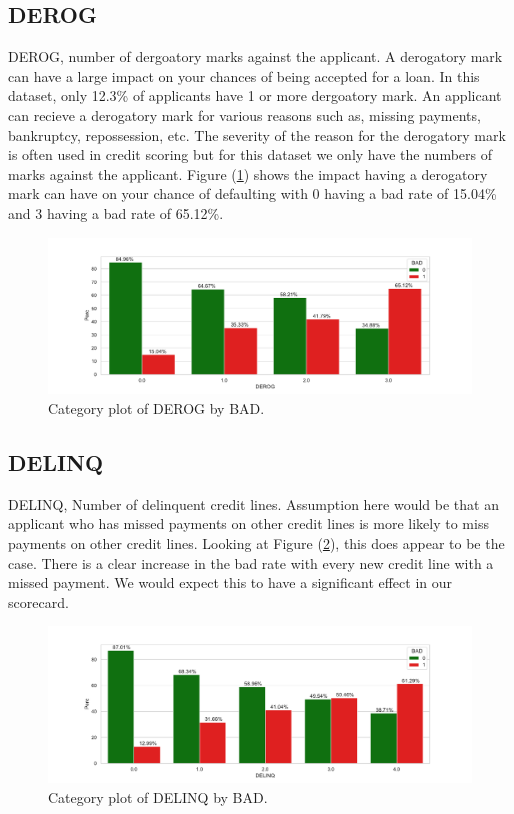 \subsection*{DEROG}

DEROG,  number of dergoatory marks against the applicant. A derogatory mark can have a large impact on your chances of being accepted for a loan. In this dataset,  only 12.3\% of applicants have 1 or more dergoatory mark. An applicant can recieve a derogatory mark for various reasons such as,  missing payments, bankruptcy, repossession, etc. The severity of the reason for the derogatory mark is often used in credit scoring but for this dataset we only have the numbers of marks against the applicant. Figure (\ref{derog_cat}) shows the impact having a derogatory mark can have on your chance of defaulting with 0 having a bad rate of 15.04\% and 3 having a bad rate of 65.12\%.

\begin{figure}[H]
	\centering
	\includegraphics[scale=0.40]{figs/derog_cat.pdf}
	\caption{Category plot of DEROG by BAD. \label{derog_cat}}
\end{figure}

\subsection*{DELINQ}

DELINQ,  Number of delinquent credit lines. Assumption here would be that an applicant who has missed payments on other credit lines is more likely to miss payments on other credit lines. Looking at Figure (\ref{delinq_cat}), this does appear to be the case. There is a clear increase in the bad rate with every new credit line with a missed payment. We would expect this to have a significant effect in our scorecard. 

\begin{figure}[H]
	\centering
	\includegraphics[scale=0.40]{figs/delinq_cat.pdf}
	\caption{Category plot of DELINQ by BAD. \label{delinq_cat}}
\end{figure}


